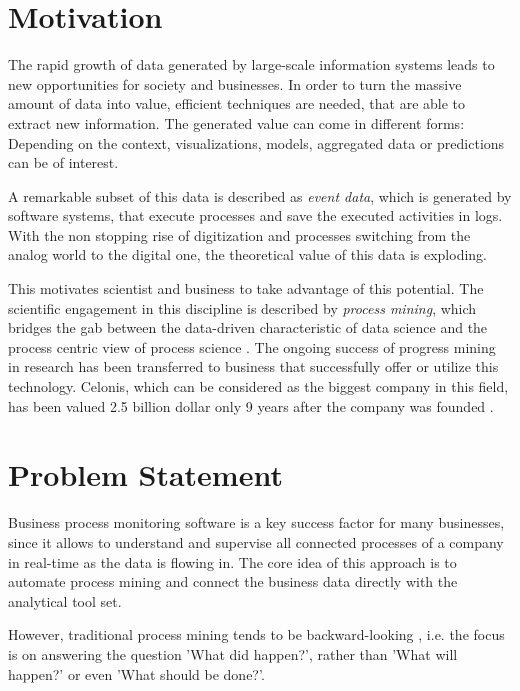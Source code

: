 
\section{Motivation}

The rapid growth of data generated by large-scale information systems leads to new opportunities for  society and businesses.
In order to turn the massive amount of data into value, efficient techniques are needed, that are able to extract new information.
The generated value can come in different forms: Depending on the context, visualizations, models, aggregated data or predictions can be of interest. 

A remarkable subset of this data is described as \textit{event data}, which is generated by software systems, that execute processes and save the executed activities in logs.
With the non stopping rise of digitization and processes switching from the analog world to the digital one, the theoretical value of this data is exploding.

This motivates scientist and business to take advantage of this potential.
The scientific engagement in this discipline is described by \textit{process mining}, which bridges the gab between the data-driven characteristic of data science and the process centric view of process science \cite{DBLP:books/sp/Aalst16}.
The ongoing success of progress mining in research has been transferred to business that successfully offer or utilize this technology.
Celonis, which can be considered as the biggest company in this field, has been valued 2.5 billion dollar only 9 years after the company was founded \cite{celonis}.



\section{Problem Statement}

Business process monitoring software is a key success factor for many businesses, since it allows to understand and supervise all connected processes of a company in real-time as the data is flowing in.
The core idea of this approach is to automate process mining and connect the business data directly with the analytical tool set.

However, traditional process mining tends to be backward-looking  \cite{DBLP:conf/scsc/Aalst18}, i.e. the focus is on answering the question 'What did happen?', rather than 'What will happen?' or even 'What should be done?'.

